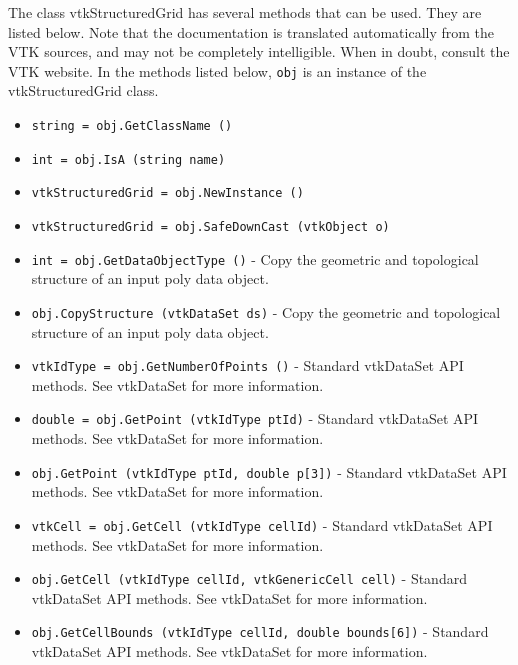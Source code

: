 The class vtkStructuredGrid has several methods that can be used.
  They are listed below.
Note that the documentation is translated automatically from the VTK sources,
and may not be completely intelligible.  When in doubt, consult the VTK website.
In the methods listed below, \verb|obj| is an instance of the vtkStructuredGrid class.
\begin{itemize}
\item  \verb|string = obj.GetClassName ()|

\item  \verb|int = obj.IsA (string name)|

\item  \verb|vtkStructuredGrid = obj.NewInstance ()|

\item  \verb|vtkStructuredGrid = obj.SafeDownCast (vtkObject o)|

\item  \verb|int = obj.GetDataObjectType ()| -  Copy the geometric and topological structure of an input poly data object.

\item  \verb|obj.CopyStructure (vtkDataSet ds)| -  Copy the geometric and topological structure of an input poly data object.

\item  \verb|vtkIdType = obj.GetNumberOfPoints ()| -  Standard vtkDataSet API methods. See vtkDataSet for more information.

\item  \verb|double = obj.GetPoint (vtkIdType ptId)| -  Standard vtkDataSet API methods. See vtkDataSet for more information.

\item  \verb|obj.GetPoint (vtkIdType ptId, double p[3])| -  Standard vtkDataSet API methods. See vtkDataSet for more information.

\item  \verb|vtkCell = obj.GetCell (vtkIdType cellId)| -  Standard vtkDataSet API methods. See vtkDataSet for more information.

\item  \verb|obj.GetCell (vtkIdType cellId, vtkGenericCell cell)| -  Standard vtkDataSet API methods. See vtkDataSet for more information.

\item  \verb|obj.GetCellBounds (vtkIdType cellId, double bounds[6])| -  Standard vtkDataSet API methods. See vtkDataSet for more information.


\end{itemize}
